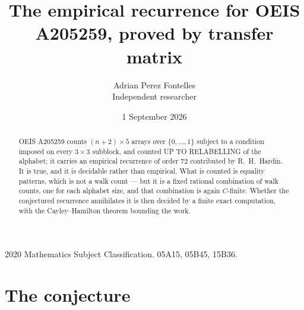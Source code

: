 \documentclass[11pt,a4paper]{article}
\title{The empirical recurrence for OEIS A205259, proved by transfer matrix}
\author{Adrian Perez Fontelles\\ \small Independent researcher}
\date{1 September 2026}
\theoremstyle{plain}
\theoremstyle{definition}
\begin{document}
\maketitle

\begin{abstract}
OEIS A205259 counts $(n+2)\times5$ arrays over $\{0,\dots,1\}$ subject to a condition imposed on
every $3\times3$ subblock, and counted UP TO RELABELLING of the
alphabet; it carries an empirical recurrence of order $72$ contributed by
R.~H.~Hardin. It is true, and it is decidable rather than empirical. What is counted is
equality patterns, which is not a walk count --- but it is a fixed rational combination of
walk counts, one for each alphabet size, and that combination is again $C$-finite. Whether the
conjectured recurrence annihilates it is then decided by a finite exact computation, with the
Cayley--Hamilton theorem bounding the work.
\end{abstract}

\noindent\small 2020 Mathematics Subject Classification. 05A15, 05B45, 15B36.\normalsize

\section{The conjecture}
\end{document}
